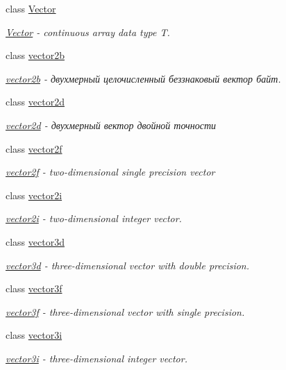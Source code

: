 \begin{DoxyCompactItemize}
class \hyperlink{classbt_1_1_vector}{Vector}
\begin{DoxyCompactList}\small\item\em \hyperlink{classbt_1_1_vector}{Vector} -\/ continuous array data type T. \end{DoxyCompactList}\item 
class \hyperlink{classbt_1_1vector2b}{vector2b}
\begin{DoxyCompactList}\small\item\em \hyperlink{classbt_1_1vector2b}{vector2b} -\/ двухмерный целочисленный беззнаковый вектор байт. \end{DoxyCompactList}\item 
class \hyperlink{classbt_1_1vector2d}{vector2d}
\begin{DoxyCompactList}\small\item\em \hyperlink{classbt_1_1vector2d}{vector2d} -\/ двухмерный вектор двойной точности \end{DoxyCompactList}\item 
class \hyperlink{classbt_1_1vector2f}{vector2f}
\begin{DoxyCompactList}\small\item\em \hyperlink{classbt_1_1vector2f}{vector2f} -\/ two-\/dimensional single precision vector \end{DoxyCompactList}\item 
class \hyperlink{classbt_1_1vector2i}{vector2i}
\begin{DoxyCompactList}\small\item\em \hyperlink{classbt_1_1vector2i}{vector2i} -\/ two-\/dimensional integer vector. \end{DoxyCompactList}\item 
class \hyperlink{classbt_1_1vector3d}{vector3d}
\begin{DoxyCompactList}\small\item\em \hyperlink{classbt_1_1vector3d}{vector3d} -\/ three-\/dimensional vector with double precision. \end{DoxyCompactList}\item 
class \hyperlink{classbt_1_1vector3f}{vector3f}
\begin{DoxyCompactList}\small\item\em \hyperlink{classbt_1_1vector3f}{vector3f} -\/ three-\/dimensional vector with single precision. \end{DoxyCompactList}\item 
class \hyperlink{classbt_1_1vector3i}{vector3i}
\begin{DoxyCompactList}\small\item\em \hyperlink{classbt_1_1vector3i}{vector3i} -\/ three-\/dimensional integer vector. \end{DoxyCompactList}\item 

\end{DoxyCompactItemize}
